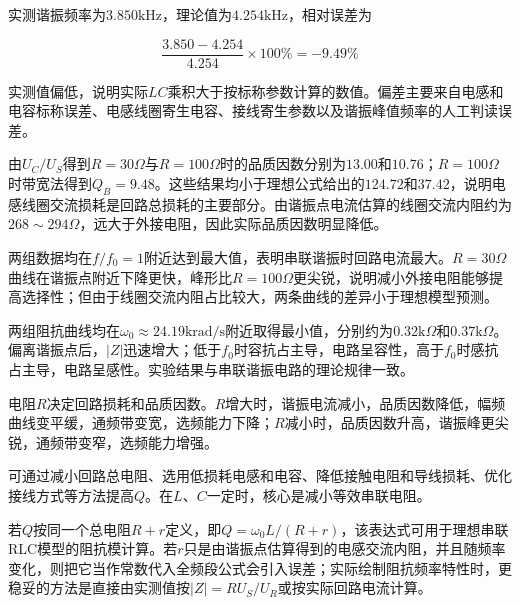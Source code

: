 \documentclass{eleclab-report}
\newcommand{\AnalysisParagraph}[1]{\par\hspace*{2em}#1\par}
\begin{document}
\AnalysisParagraph{实测谐振频率为$3.850\mathrm{kHz}$，理论值为$4.254\mathrm{kHz}$，相对误差为}
\[
  \frac{3.850-4.254}{4.254}\times100\%=-9.49\%
\]
\AnalysisParagraph{实测值偏低，说明实际$LC$乘积大于按标称参数计算的数值。偏差主要来自电感和电容标称误差、电感线圈寄生电容、接线寄生参数以及谐振峰值频率的人工判读误差。}
\AnalysisParagraph{由$U_C/U_S$得到$R=30\Omega$与$R=100\Omega$时的品质因数分别为$13.00$和$10.76$；$R=100\Omega$时带宽法得到$Q_B=9.48$。这些结果均小于理想公式给出的$124.72$和$37.42$，说明电感线圈交流损耗是回路总损耗的主要部分。由谐振点电流估算的线圈交流内阻约为$268\sim294\Omega$，远大于外接电阻，因此实际品质因数明显降低。}
\AnalysisParagraph{两组数据均在$f/f_0=1$附近达到最大值，表明串联谐振时回路电流最大。$R=30\Omega$曲线在谐振点附近下降更快，峰形比$R=100\Omega$更尖锐，说明减小外接电阻能够提高选择性；但由于线圈交流内阻占比较大，两条曲线的差异小于理想模型预测。}
\AnalysisParagraph{两组阻抗曲线均在$\omega_0\approx24.19\mathrm{krad/s}$附近取得最小值，分别约为$0.32\mathrm{k}\Omega$和$0.37\mathrm{k}\Omega$。偏离谐振点后，$|Z|$迅速增大；低于$f_0$时容抗占主导，电路呈容性，高于$f_0$时感抗占主导，电路呈感性。实验结果与串联谐振电路的理论规律一致。}

\labresetitems
{}
电阻$R$决定回路损耗和品质因数。$R$增大时，谐振电流减小，品质因数降低，幅频曲线变平缓，通频带变宽，选频能力下降；$R$减小时，品质因数升高，谐振峰更尖锐，通频带变窄，选频能力增强。

可通过减小回路总电阻、选用低损耗电感和电容、降低接触电阻和导线损耗、优化接线方式等方法提高$Q$。在$L$、$C$一定时，核心是减小等效串联电阻。

若$Q$按同一个总电阻$R+r$定义，即$Q=\omega_0L/(R+r)$，该表达式可用于理想串联RLC模型的阻抗模计算。若$r$只是由谐振点估算得到的电感交流内阻，并且随频率变化，则把它当作常数代入全频段公式会引入误差；实际绘制阻抗频率特性时，更稳妥的方法是直接由实测值按$|Z|=RU_S/U_R$或按实际回路电流计算。
\end{document}
